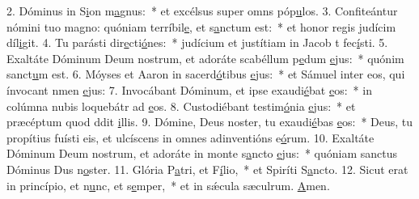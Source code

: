 2. Dóminus in S\uline{i}on m\uline{a}gnus:~* et excélsus super omns póp\uline{u}los.
3. Confiteántur nómini tuo magno: quóniam terríbil\uline{e}, et s\uline{a}nctum est:~* et honor regis judícim díl\uline{i}git.
4. Tu parásti dir\uline{e}cti\uline{ó}nes:~* judícium et justítiam in Jacob t fec\uline{í}sti.
5. Exaltáte Dóminum Deum nostrum, et adoráte scabéllum p\uline{e}dum \uline{e}jus:~* quónim sanct\uline{u}m est.
6. Móyses et Aaron in sacerd\uline{ó}tibus \uline{e}jus:~* et Sámuel inter eos, qui ínvocant nmen \uline{e}jus:
7. Invocábant Dóminum, et ipse exaudi\uline{é}bat \uline{e}os:~* in colúmna nubis loquebátr ad \uline{e}os.
8. Custodiébant testim\uline{ó}nia \uline{e}jus:~* et præcéptum quod ddit \uline{i}llis.
9. Dómine, Deus noster, tu exaudi\uline{é}bas \uline{e}os:~* Deus, tu propítius fuísti eis, et ulcíscens in omnes adinventións e\uline{ó}rum.
10. Exaltáte Dóminum Deum nostrum, et adoráte in monte s\uline{a}ncto \uline{e}jus:~* quóniam sanctus Dóminus Dus n\uline{o}ster.
11. Glória P\uline{a}tri, et F\uline{í}lio,~* et Spiríti S\uline{a}ncto.
12. Sicut erat in princípio, et n\uline{u}nc, et s\uline{e}mper,~* et in sǽcula sæculrum. \uline{A}men.
